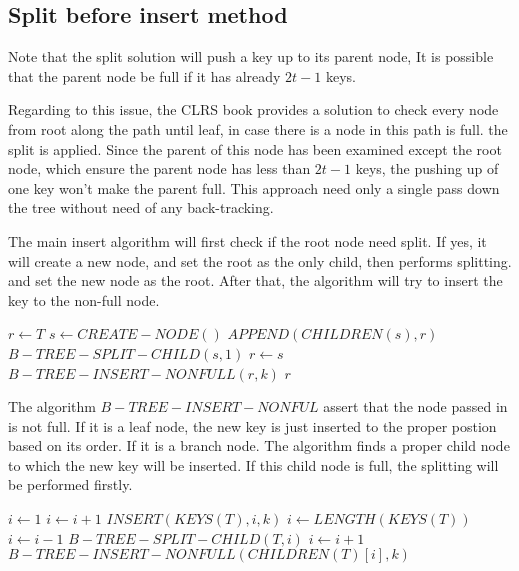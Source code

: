 \documentclass{article}
\begin{document}
\subsection{Split before insert method}
\label{split before insertion}

Note that the split solution will push a key up to its parent node,
It is possible that the parent node be full if it has already 
$2t-1$ keys.

Regarding to this issue, the CLRS book provides a solution to check 
every node from root along the path until leaf, in case there is a 
node in this path is full. the split is applied. Since the parent
of this node has been examined except the root node, which ensure
the parent node has less than $2t-1$ keys, the pushing up of one
key won't make the parent full. This approach need only a single
pass down the tree without need of any back-tracking.

The main insert algorithm will first check if the root node need
split. If yes, it will create a new node, and set the root as the 
only child, then performs splitting. and set the new node as the
root. After that, the algorithm will try to insert the key to the
non-full node.

\begin{algorithmic}[1]
  \State $r \leftarrow T$
    \State $s \leftarrow CREATE-NODE()$
    \State $APPEND(CHILDREN(s), r)$
    \State $B-TREE-SPLIT-CHILD(s, 1)$
    \State $r \leftarrow s$
  \EndIf
  \State $B-TREE-INSERT-NONFULL(r, k)$
  \State \Return $r$
\EndFunction
\end{algorithmic}

The algorithm $B-TREE-INSERT-NONFUL$ assert that the node passed in
is not full. If it is a leaf node, the new key is just inserted to 
the proper postion based on its order. If it is a branch node. The algorithm
finds a proper child node to which the new key will be inserted.
If this child node is full, the splitting will be performed firstly.

\begin{algorithmic}[1]
    \State $i \leftarrow 1$
      \State $i \leftarrow i+1$
    \EndWhile
    \State $INSERT(KEYS(T), i, k)$
  \Else
    \State $i \leftarrow LENGTH(KEYS(T))$
      \State $i \leftarrow i-1$
    \EndWhile
      \State $B-TREE-SPLIT-CHILD(T, i)$
        \State $i \leftarrow i+1$
      \EndIf
    \EndIf
    \State $B-TREE-INSERT-NONFULL(CHILDREN(T)[i], k)$
  \EndIf
\EndProcedure
\end{algorithmic}
\end{document}
